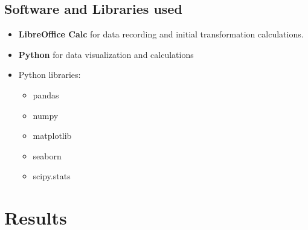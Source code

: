 \documentclass[10pt,a4paper]{article}
\begin{document}
				\subsection{Software and Libraries used}
				\begin{itemize}
					\item \textbf{LibreOffice Calc} for data recording and initial transformation calculations.
					\item \textbf{Python} for data visualization and calculations
					\item Python libraries:
					\begin{itemize}
						\item pandas
						\item numpy
						\item matplotlib
						\item seaborn
						\item scipy.stats
					\end{itemize}
				\end{itemize}		
				
			\section{Results}			
\end{document}
